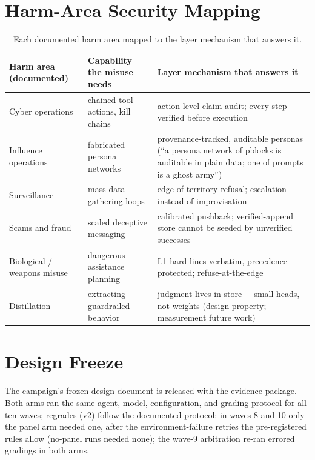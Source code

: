 \documentclass[11pt]{article}
\begin{document}
\section{Harm-Area Security Mapping}
\label{app:harm}
\begin{table}[H]
\centering
\footnotesize\setlength{\tabcolsep}{3pt}\begin{tabular}{@{}>{\raggedright\arraybackslash}p{1.6cm}>{\raggedright\arraybackslash}p{2.0cm}>{\raggedright\arraybackslash}p{3.6cm}@{}}
\toprule
Harm area (documented) & Capability the misuse needs & Layer mechanism that answers it \\
\midrule
Cyber operations & chained tool actions, kill chains & action-level claim audit; every step verified before execution \\
Influence operations & fabricated persona networks & provenance-tracked, auditable personas (``a persona network of pblocks is auditable in plain data; one of prompts is a ghost army'') \\
Surveillance & mass data-gathering loops & edge-of-territory refusal; escalation instead of improvisation \\
Scams and fraud & scaled deceptive messaging & calibrated pushback; verified-append store cannot be seeded by unverified successes \\
Biological / weapons misuse & dangerous-assistance planning & L1 hard lines verbatim, precedence-protected; refuse-at-the-edge \\
Distillation & extracting guardrailed behavior & judgment lives in store + small heads, not weights (design property; measurement future work) \\
\bottomrule
\end{tabular}
\caption{Each documented harm area mapped to the layer mechanism that answers it.}
\label{tab:harm}
\end{table}



\section{Design Freeze}
\label{app:freeze}
The campaign's frozen design document is released with the evidence package. Both arms ran the same agent, model, configuration, and grading protocol for all ten waves; regrades (v2) follow the documented protocol: in waves 8 and 10 only the panel arm needed one, after the environment-failure retries the pre-registered rules allow (no-panel runs needed none); the wave-9 arbitration re-ran errored gradings in both arms.
\end{document}
